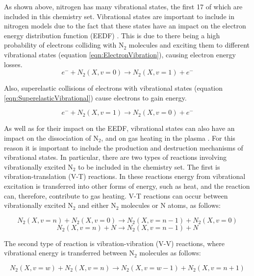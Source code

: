 \documentclass[11pt, oneside]{article}   	%
\begin{document}
As shown above, nitrogen has many vibrational states, the first 17 of which are included in this chemistry set.
Vibrational states are important to include in nitrogen models due to the fact that these states have an impact on the electron energy distribution function (EEDF) \cite{Guerra2004kinetic}.
This is due to there being a high probability of electrons colliding with N$_2$ molecules and exciting them to different vibrational states (equation \ref{eqn:ElectronVibration}), causing electron energy losses.
\begin{equation}
e^- + N_2(X,v=0) \rightarrow N_2(X,v=1) + e^-
\label{eqn:ElectronVibration}
\end{equation}

Also, superelastic collisions of electrons with vibrational states (equation \ref{eqn:SuperelasticVibrational}) cause electrons to gain energy.

\begin{equation}
e^- + N_2(X,v=1) \rightarrow N_2(X,v=0) + e^-
\label{eqn:SuperelasticVibrational}
\end{equation}

As well as for their impact on the EEDF, vibrational states can also have an impact on the dissociation of N$_2$, and on gas heating in the plasma \cite{Guerra2004kinetic}.
For this reason it is important to include the production and destruction mechanisms of vibrational states.
In particular, there are two types of reactions involving vibrationally excited N$_2$ to be included in the chemistry set.
The first is vibration-translation (V-T) reactions. In these reactions energy from vibrational excitation is transferred into other forms of energy, such as heat, and the reaction can, therefore, contribute to gas heating.
V-T reactions can occur between vibrationally excited N$_2$ and either N$_2$ molecules or N atoms, as follows:

\begin{equation}
N_2(X,v=n) + N_2 (X,v=0) \rightarrow N_2(X,v=n-1) + N_2(X,v=0)
\label{eqn:V-TN2}
\end{equation}
\begin{equation}
N_2(X,v=n) + N \rightarrow N_2(X,v=n-1) + N
\label{eqn:V-TN}
\end{equation}

The second type of reaction is vibration-vibration (V-V) reactions, where vibrational energy is transferred between N$_2$ molecules as follows:

\begin{equation}
N_2(X,v=w) + N_2 (X,v=n) \rightarrow N_2(X,v=w-1) + N_2(X,v=n+1)
\label{eqn:V-V}
\end{equation}
\end{document}
